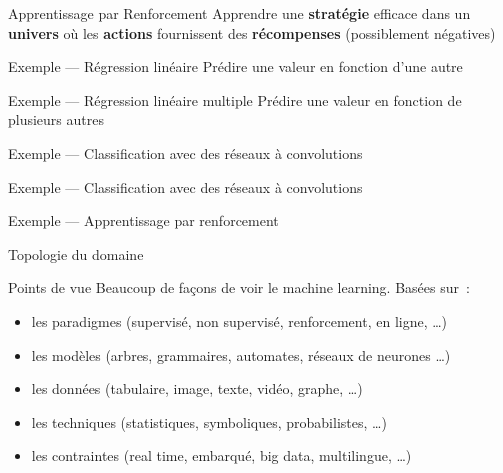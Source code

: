 \begin{frame}{Apprentissage par Renforcement}
  Apprendre une \textbf{stratégie} efficace dans un \textbf{univers} où les \textbf{actions} fournissent des \textbf{récompenses} (possiblement négatives)
  \vfill
  \begin{minipage}[l]{0.39\linewidth}
  \end{minipage}
  \begin{minipage}[l]{0.59\linewidth}
  \end{minipage}
\end{frame}

\begin{frame}{Exemple --- Régression linéaire}
  Prédire une valeur en fonction d'une autre

\end{frame}

\begin{frame}{Exemple --- Régression linéaire multiple}
  Prédire une valeur en fonction de plusieurs autres

\end{frame}

\begin{frame}{Exemple --- Classification avec des réseaux à convolutions}
\end{frame}

\begin{frame}{Exemple --- Classification avec des réseaux à convolutions}
\end{frame}

\begin{frame}{Exemple --- Apprentissage par renforcement}
\end{frame}

\begin{frame}{Topologie du domaine}
\end{frame}

\begin{frame}{Points de vue}
  Beaucoup de façons de voir le machine learning. Basées sur :
  \begin{itemize}[<+->]
  \item les paradigmes (supervisé, non supervisé, renforcement, en
    ligne, …)
  \item les modèles (arbres, grammaires, automates, réseaux de
    neurones …)
  \item les données (tabulaire, image, texte, vidéo, graphe, …)
  \item les techniques (statistiques, symboliques, probabilistes, …)
  \item les contraintes (real time, embarqué, big data, multilingue,
    …)
  \end{itemize}

\end{frame}

